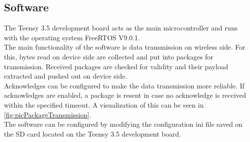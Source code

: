 \subsection{Software} \label{sec:txtSwOutcomeVa1}
The Teensy 3.5 development board acts as the main microcontroller and runs with the operating system FreeRTOS V9.0.1.\\
The main functionality of the software is data transmission on wireless side. For this, bytes read on device side are collected and put into packages for transmission. Received packages are checked for validity and their payload extracted and pushed out on device side.\\
Acknowledges can be configured to make the data transmission more reliable. If acknowledges are enabled, a package is resent in case no acknowledge is received within the specified timeout. A visualization of this can be seen in \autoref{fig:picPackageTransmission}.\\
%
%
%
The software can be configured by modifying the configuration ini file saved on the SD card located on the Teensy 3.5 development board.\\
